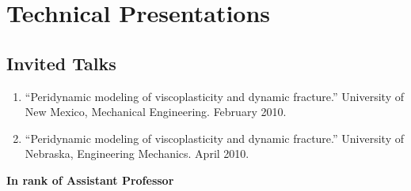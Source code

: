 \section*{Technical Presentations}

\subsection*{Invited Talks}

\ifdefined\iscockrell
\begin{enumerate}
    \item ``Peridynamic modeling of viscoplasticity and dynamic fracture.''  University of New Mexico, Mechanical Engineering. February 2010.

    \item ``Peridynamic modeling of viscoplasticity and dynamic fracture.''  University of Nebraska, Engineering Mechanics. April 2010.
\end{enumerate}
    \pagebreak[2]
    \textbf{In rank of Assistant Professor}
